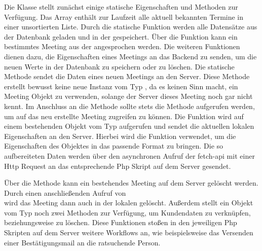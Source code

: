 Die Klasse  stellt zunächst einige statische Eigenschaften und
Methoden zur Verfügung. Das Array  enthält zur Laufzeit alle
aktuell bekannten Termine in einer unsortierten Liste. Durch die statische
Funktion  werden alle Datensätze aus der Datenbank
geladen und in der  gespeichert. Über die Funktion
 kann ein bestimmtes Meeting aus der 
angesprochen werden. Die weiteren Funktionen dienen dazu, die Eigenschaften
eines Meetings an das Backend zu senden, um die neuen Werte in der Datenbank zu
speichern oder zu löschen. Die statische Methode
 sendet die Daten eines neuen Meetings an den
Server. Diese Methode erstellt bewusst keine neue Instanz vom Typ
, da es keinen Sinn macht, ein Meeting Objekt zu verwenden,
solange der Server dieses Meeting noch gar nicht kennt. Im Anschluss an die
 Methode sollte stets die Methode
 aufgerufen werden, um auf das neu erstellte Meeting
zugreifen zu können. Die Funktion  wird auf einem
bestehenden Objekt vom Typ  aufgerufen und sendet die aktuellen
lokalen Eigenschaften an den Server. Hierbei wird die Funktion
 verwendet, um die Eigenschaften des Objektes in das
passende Format zu bringen. Die so aufbereiteten Daten werden über den
asynchronen Aufruf der \gls{fetch-api} mit einer Http Request an das
entsprechende Php Skript auf dem Server gesendet.



Über die Methode  kann ein bestehendes Meeting auf dem Server gelöscht werden. Durch einen anschließenden Aufruf von\\  wird das Meeting dann auch in der lokalen  gelöscht. Außerdem stellt ein Objekt vom Typ  noch zwei Methoden zur Verfügung, um Kundendaten zu verknüpfen, beziehungsweise zu löschen. Diese Funktionen stoßen in den jeweiligen Php Skripten auf dem Server weitere Workflows an, wie beispielsweise das Versenden einer Bestätigungsmail an die ratsuchende Person.





